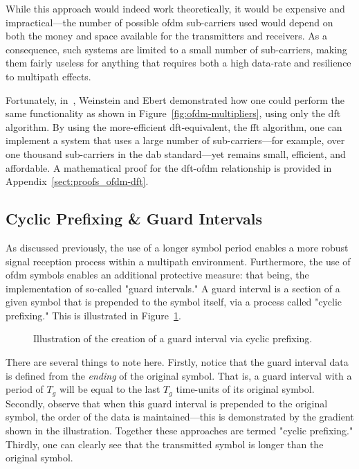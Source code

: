 \documentclass[class=report,11pt,crop=false]{standalone}
\begin{document}
While this approach would indeed work theoretically, it would be expensive and impractical---the number of possible \gls{ofdm} sub-carriers used would depend on both the money and space available for the transmitters and receivers. As a consequence, such systems are limited to a small number of sub-carriers, making them fairly useless for anything that requires both a high data-rate and resilience to multipath effects.

Fortunately, in~\cite{Weinstein1971}, Weinstein and Ebert demonstrated how one could perform the same functionality as shown in Figure~\ref{fig:ofdm-multipliers}, using only the \gls{dft} algorithm. By using the more-efficient \gls{dft}-equivalent, the \gls{fft} algorithm, one can implement a system that uses a large number of sub-carriers---for example, over one thousand sub-carriers in the \gls{dab} standard---yet remains small, efficient, and affordable. A mathematical proof for the \gls{dft}-\gls{ofdm} relationship is provided in Appendix~\ref{sect:proofs_ofdm-dft}.

\subsection{Cyclic Prefixing \& Guard Intervals}
As discussed previously, the use of a longer symbol period enables a more robust signal reception process within a multipath environment. Furthermore, the use of \gls{ofdm} symbols enables an additional protective measure: that being, the implementation of so-called "guard intervals." A guard interval is a section of a given symbol that is prepended to the symbol itself, via a process called "cyclic prefixing." This is illustrated in Figure~\ref{fig:cyclic-prefix}.

\begin{figure}[htbp]
    \centering
    \captionsetup{type=figure}
    \def\svgwidth{0.7\linewidth}
    { %
        }
    \caption{Illustration of the creation of a guard interval via cyclic prefixing.}
    \label{fig:cyclic-prefix}
\end{figure}

There are several things to note here. Firstly, notice that the guard interval data is defined from the \emph{ending} of the original symbol. That is, a guard interval with a period of \(T_g\) will be equal to the last \(T_g\) time-units of its original symbol. Secondly, observe that when this guard interval is prepended to the original symbol, the order of the data is maintained---this is demonstrated by the gradient shown in the illustration. Together these approaches are termed "cyclic prefixing." Thirdly, one can clearly see that the transmitted symbol is longer than the original symbol.
\end{document}
